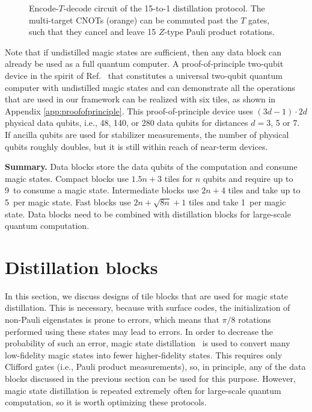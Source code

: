 \documentclass[prx,aps,letterpaper,twocolumn,allowfontchageintitle=true,accepted=2019-02-01]{quantumarticle}
\begin{document}
\begin{figure}[t!]
\centering
\def\svgwidth{\linewidth}

\caption{Encode-$T$-decode circuit of the 15-to-1 distillation protocol. The multi-target CNOTs (orange) can be commuted past the $T$ gates, such that they cancel and leave 15 $Z$-type Pauli product rotations. }
\label{fig:15to1circuit1}
\end{figure}

Note that if undistilled magic states are sufficient, then any data block can already be used as a full quantum computer. A proof-of-principle two-qubit device in the spirit of Ref.~\cite{Lavasani2018} that constitutes a universal two-qubit quantum computer with undistilled magic states and can demonstrate all the operations that are used in our framework can be realized with six tiles, as shown in Appendix \ref{app:proofofprinciple}. This proof-of-principle device uses $(3d-1)\cdot 2d$ physical data qubits, i.e., 48, 140, or 280 data qubits for distances $d=3$, 5 or 7. If ancilla qubits are used for stabilizer measurements, the number of physical qubits roughly doubles, but it is still within reach of near-term devices. 

\textbf{Summary.} Data blocks store the data qubits of the computation and consume magic states. Compact blocks use $1.5n+3$ tiles for $n$ qubits and require up to 9\clock \ to consume a magic state. Intermediate blocks use $2n+4$ tiles and take up to 5\clock \ per magic state. Fast blocks use $2n+\sqrt{8n}+1$ tiles and take 1\clock \ per magic state. Data blocks need to be combined with distillation blocks for large-scale quantum computation.

\section{Distillation blocks}
\label{sec:distillation}



In this section, we discuss designs of tile blocks that are used for magic state distillation. This is necessary, because with surface codes, the initialization of non-Pauli eigenstates is prone to errors, which means that $\pi/8$ rotations performed using these states may lead to errors. In order to decrease the probability of such an error, magic state distillation~\cite{Bravyi2005} is used to convert many low-fidelity magic states into fewer higher-fidelity states. This requires only Clifford gates (i.e., Pauli product measurements), so, in principle, any of the data blocks discussed in the previous section can be used for this purpose. However, magic state distillation is repeated extremely often for large-scale quantum computation, so it is worth optimizing these protocols.
\end{document}
